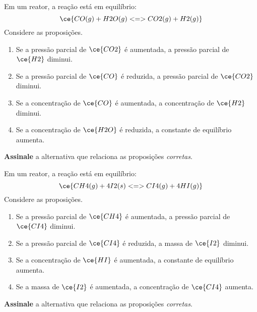 \begin{problem}[
	id={2F29},
	path={/home/braun/Documents/Developer/braunchem/data/problems/Q2/2F/2F29}
]
Em um reator, a reação está em equilíbrio: {\[
    \ce{ CO(g) + H2O(g) <=> CO2(g) + H2(g) }
\]} Considere as proposições.

\begin{enumerate}
\def\labelenumi{\arabic{enumi}.}
\tightlist
\item
  Se a pressão parcial de {\(\ce{CO2}\)} é aumentada, a pressão parcial de {\(\ce{H2}\)} diminui.
\item
  Se a pressão parcial de {\(\ce{CO}\)} é reduzida, a pressão parcial de {\(\ce{CO2}\)} diminui.
\item
  Se a concentração de {\(\ce{CO}\)} é aumentada, a concentração de {\(\ce{H2}\)} diminui.
\item
  Se a concentração de {\(\ce{H2O}\)} é reduzida, a constante de equilíbrio aumenta.
\end{enumerate}

\textbf{Assinale} a alternativa que relaciona as proposições \emph{corretas}.
\end{problem}


\begin{problem}[
	id={2F30},
	path={/home/braun/Documents/Developer/braunchem/data/problems/Q2/2F/2F30}
]
Em um reator, a reação está em equilíbrio: {\[
    \ce{ CH4(g) + 4 I2(s) <=> CI4(g) + 4 HI(g) }
\]} Considere as proposições.

\begin{enumerate}
\def\labelenumi{\arabic{enumi}.}
\tightlist
\item
  Se a pressão parcial de {\(\ce{CH4}\)} é aumentada, a pressão parcial de {\(\ce{CI4}\)} diminui.
\item
  Se a pressão parcial de {\(\ce{CI4}\)} é reduzida, a massa de {\(\ce{I2}\)} diminui.
\item
  Se a concentração de {\(\ce{HI}\)} é aumentada, a constante de equilíbrio aumenta.
\item
  Se a massa de {\(\ce{I2}\)} é aumentada, a concentração de {\(\ce{CI4}\)} aumenta.
\end{enumerate}

\textbf{Assinale} a alternativa que relaciona as proposições \emph{corretas}.
\end{problem}


